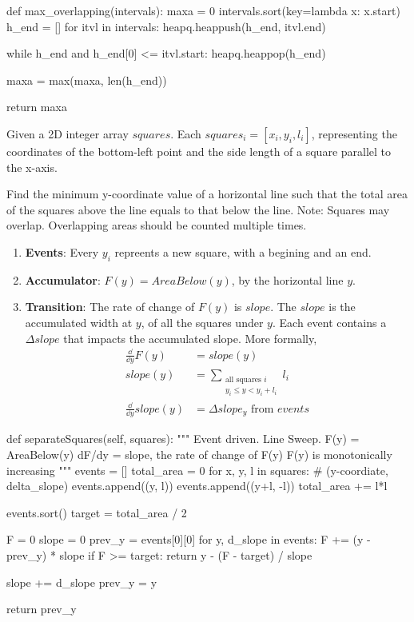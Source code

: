 \begin{python}
def max_overlapping(intervals):
    maxa = 0
    intervals.sort(key=lambda x: x.start)
    h_end = []
    for itvl in intervals:
        heapq.heappush(h_end, itvl.end)
        
        while h_end and h_end[0] <= itvl.start:
            heapq.heappop(h_end)

        maxa = max(maxa, len(h_end))

    return maxa
\end{python}

 Given a 2D integer array $squares$. Each $squares_i = [x_i, y_i, l_i]$, representing the coordinates of the bottom-left point and the side length of a square parallel to the x-axis.

Find the minimum y-coordinate value of a horizontal line such that the total area of the squares above the line equals to that below the line. Note: Squares may overlap. Overlapping areas should be counted multiple times.

\begin{enumerate}
\item \textbf{Events}: Every $y_i$ repreents a new square, with a begining and an end. 
\item \textbf{Accumulator}: $F(y) = AreaBelow(y)$, by the horizontal line $y$. 
\item \textbf{Transition}: The rate of change of $F(y)$ is $slope$. The $slope$ is the accumulated width at $y$, of all the squares under $y$. Each event contains a $\Delta slope$ that impacts the accumulated slope. More formally,
\begin{align*}
  \frac{\dd}{\dd y}F(y) &= slope(y) \\
  slope(y) &= \sum_{\substack{\text{all squares }i \\ y_i \le y < y_i + l_i}} l_i \\ 
  \frac{\dd}{\dd y}slope(y) &= \Delta slope_y \text{ from } events
\end{align*}
\end{enumerate}
\begin{python}
def separateSquares(self, squares):
    """
    Event driven. Line Sweep.
    F(y) = AreaBelow(y)
    dF/dy = slope, the rate of change of F(y)
    F(y) is monotonically increasing 
    """
    events = []
    total_area = 0
    for x, y, l in squares:
        # (y-coordiate, delta_slope)
        events.append((y, l))
        events.append((y+l, -l))
        total_area += l*l
    
    events.sort()
    target = total_area / 2

    F = 0 
    slope = 0
    prev_y = events[0][0]
    for y, d_slope in events:
        F += (y - prev_y) * slope
        if F >= target:
            return y - (F - target) / slope

        slope += d_slope
        prev_y = y
    
    return prev_y
\end{python}

